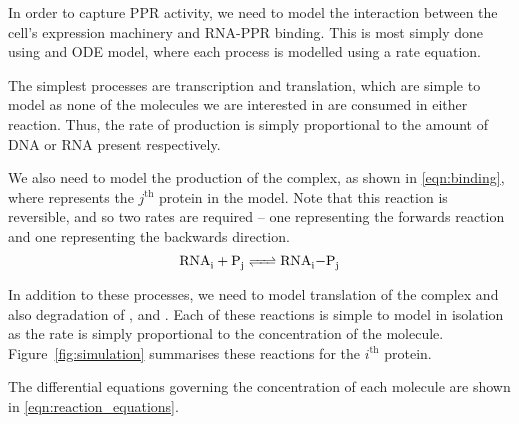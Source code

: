 In order to capture PPR activity, we need to model the interaction between the
cell's expression machinery and RNA-PPR binding.
This is most simply done using and ODE model, where each process is modelled
using a rate equation.

The simplest processes are transcription and translation, which are simple to
model as none of the molecules we are interested in are consumed in either 
reaction. 
Thus, the rate of production is simply proportional to the amount of DNA or RNA
present respectively.

We also need to model the production of the  complex, as shown in
\ref{eqn:binding}, where  represents the $j^{\mathrm{th}}$ protein in 
the model.
Note that this reaction is reversible, and so two rates are required -- one
representing the forwards reaction and one representing the backwards
direction.
\begin{equation}
  \cee{ RNA_i + P_j <=> RNA_i-P_j }
  \label{eqn:binding}
\end{equation}

In addition to these processes, we need to model translation of the
 complex and also degradation of ,  and .
Each of these reactions is simple to model in isolation as the rate is simply
proportional to the concentration of the molecule.
Figure~\ref{fig:simulation} summarises these reactions for the $i^\mathrm{th}$
protein.

The differential equations governing the concentration of each molecule are 
shown in \ref{eqn:reaction_equations}.

